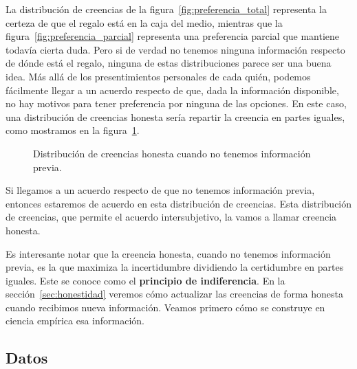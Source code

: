 \documentclass[a4paper,10pt]{book}
\begin{document}
La distribución de creencias de la figura~\ref{fig:preferencia_total} representa la certeza de que el regalo está en la caja del medio, mientras que la figura~\ref{fig:preferencia_parcial} representa una preferencia parcial que mantiene todavía cierta duda.
Pero si de verdad no tenemos ninguna información respecto de dónde está el regalo, ninguna de estas distribuciones parece ser una buena idea.
Más allá de los presentimientos personales de cada quién, podemos fácilmente llegar a un acuerdo respecto de que, dada la información disponible, no hay motivos para tener preferencia por ninguna de las opciones.
En este caso, una distribución de creencias honesta sería repartir la creencia en partes iguales, como mostramos en la figura~\ref{fig:distribucion_de_creencias_honesta}.

\begin{figure}[ht!]     
 \centering
{} 
\caption{Distribución de creencias honesta cuando no tenemos información previa.}
 \label{fig:distribucion_de_creencias_honesta}
\end{figure}

Si llegamos a un acuerdo respecto de que no tenemos información previa, entonces estaremos de acuerdo en esta distribución de creencias.
Esta distribución de creencias, que permite el acuerdo intersubjetivo, la vamos a llamar creencia honesta.


Es interesante notar que la creencia honesta, cuando no tenemos información previa, es la que maximiza la incertidumbre dividiendo la certidumbre en partes iguales.
Este se conoce como el \textbf{principio de indiferencia}.
En la sección~\ref{sec:honestidad} veremos cómo actualizar las creencias de forma honesta cuando recibimos nueva información.
Veamos primero cómo se construye en ciencia empírica esa información.

\subsection{Datos}
\end{document}
